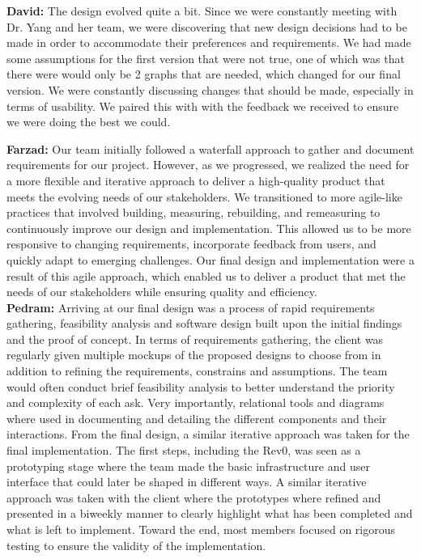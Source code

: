 \documentclass{article}
\begin{document}
\textbf{David:} The design evolved quite a bit. Since we were constantly meeting with Dr. Yang and her team, we were 
discovering that new design decisions had to be made in order to accommodate their preferences and requirements. We had 
made some assumptions for the first version that were not true, one of which was that there were would only be 2 
graphs that are needed, which changed for our final version. We were constantly discussing changes that should be made,
especially in terms of usability. We paired this with with the feedback we received to ensure we were doing the best we 
could. 

\textbf{Farzad:} Our team initially followed a waterfall approach to gather and document requirements for our project. However, as we progressed, we realized the need for a more flexible and iterative approach to deliver a high-quality product that meets the evolving needs of our stakeholders. We transitioned to more agile-like practices that involved building, measuring, rebuilding, and remeasuring to continuously improve our design and implementation. This allowed us to be more responsive to changing requirements, incorporate feedback from users, and quickly adapt to emerging challenges. Our final design and implementation were a result of this agile approach, which enabled us to deliver a product that met the needs of our stakeholders while ensuring quality and efficiency.\\

\textbf{Pedram:} Arriving at our final design was a process of rapid requirements gathering, feasibility analysis and software design built upon the initial findings and the 
proof of concept. In terms of requirements gathering, the client was regularly given multiple mockups of the proposed designs to choose from in addition to refining the 
requirements, constrains and assumptions. The team would often conduct brief feasibility analysis to better understand the priority and complexity of each ask. 
Very importantly, relational tools and diagrams where used in documenting and detailing the different components and their interactions.  
From the final design, a similar iterative approach was taken for the final implementation. 
The first steps, including the Rev0, was seen as a prototyping stage where the team made the basic infrastructure and user interface that could later be shaped in different 
ways. A similar iterative approach was taken with the client where the prototypes where refined and presented in a biweekly manner to clearly highlight what has been completed 
and what is left to implement. Toward the end, most members focused on rigorous testing to ensure the validity of the implementation.\\
\end{document}
